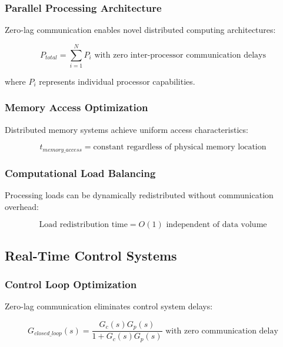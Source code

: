 \documentclass[12pt,a4paper]{article}
\begin{document}
\subsubsection{Parallel Processing Architecture}

Zero-lag communication enables novel distributed computing architectures:

\begin{equation}
P_{total} = \sum_{i=1}^N P_i \text{ with zero inter-processor communication delays}
\label{eq:parallel_processing}
\end{equation}

where $P_i$ represents individual processor capabilities.

\subsubsection{Memory Access Optimization}

Distributed memory systems achieve uniform access characteristics:

\begin{equation}
t_{memory\_access} = \text{constant} \text{ regardless of physical memory location}
\label{eq:uniform_memory_access}
\end{equation}

\subsubsection{Computational Load Balancing}

Processing loads can be dynamically redistributed without communication overhead:

\begin{equation}
\text{Load redistribution time} = O(1) \text{ independent of data volume}
\label{eq:instant_load_balancing}
\end{equation}

\subsection{Real-Time Control Systems}

\subsubsection{Control Loop Optimization}

Zero-lag communication eliminates control system delays:

\begin{equation}
G_{closed\_loop}(s) = \frac{G_c(s)G_p(s)}{1 + G_c(s)G_p(s)} \text{ with zero communication delay}
\label{eq:zero_delay_control}
\end{equation}
\end{document}

